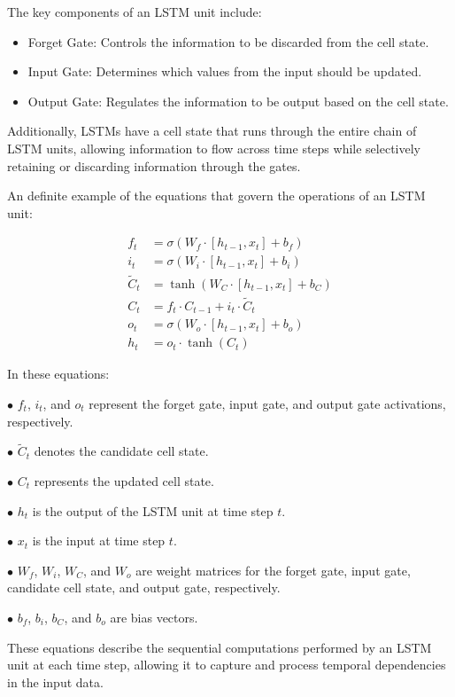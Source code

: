The key components of an LSTM unit include:

\begin{itemize}
    \item Forget Gate: Controls the information to be discarded from the cell state.
    \item Input Gate: Determines which values from the input should be updated.
    \item Output Gate: Regulates the information to be output based on the cell state.
\end{itemize}

Additionally, LSTMs have a cell state that runs through the entire chain of LSTM units, allowing information to flow across time steps while selectively retaining or discarding information through the gates.

An definite example of the equations that govern the operations of an LSTM unit:

\begin{align*}
f_t & = \sigma(W_f \cdot [h_{t-1}, x_t] + b_f) \\
i_t & = \sigma(W_i \cdot [h_{t-1}, x_t] + b_i) \\
\tilde{C}_t & = \tanh(W_C \cdot [h_{t-1}, x_t] + b_C) \\
C_t & = f_t \cdot C_{t-1} + i_t \cdot \tilde{C}_t \\
o_t & = \sigma(W_o \cdot [h_{t-1}, x_t] + b_o) \\
h_t & = o_t \cdot \tanh(C_t)
\end{align*}

In these equations:

$\bullet$ $f_t$, $i_t$, and $o_t$ represent the forget gate, input gate, and output gate activations, respectively. 

$\bullet$ $\tilde{C}_t$ denotes the candidate cell state.

$\bullet$ $C_t$ represents the updated cell state.

$\bullet$ $h_t$ is the output of the LSTM unit at time step $t$.

$\bullet$ $x_t$ is the input at time step $t$.

$\bullet$ $W_f$, $W_i$, $W_C$, and $W_o$ are weight matrices for the forget gate, input gate, candidate cell state, and output gate, respectively.
    
$\bullet$ $b_f$, $b_i$, $b_C$, and $b_o$ are bias vectors.

These equations describe the sequential computations performed by an LSTM unit at each time step, allowing it to capture and process temporal dependencies in the input data.
